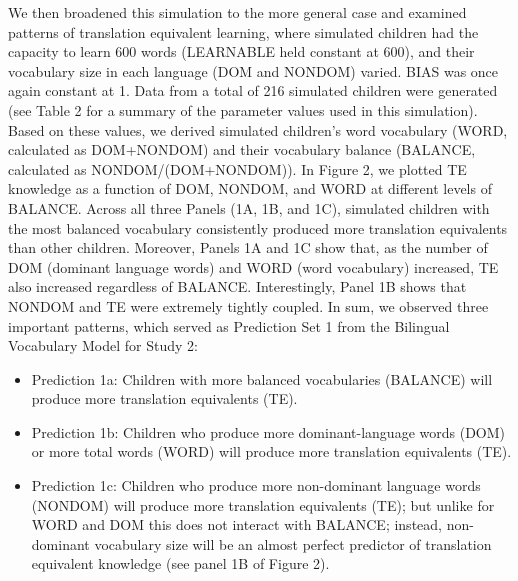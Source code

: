 \documentclass[
  english,
  ,man,floatsintext]{apa6}
\providecommand{\tightlist}{%
  \setlength{\itemsep}{0pt}\setlength{\parskip}{0pt}}
\begin{document}
We then broadened this simulation to the more general case and examined patterns of translation equivalent learning, where simulated children had the capacity to learn 600 words (LEARNABLE held constant at 600), and their vocabulary size in each language (DOM and NONDOM) varied. BIAS was once again constant at 1. Data from a total of 216 simulated children were generated (see Table 2 for a summary of the parameter values used in this simulation). Based on these values, we derived simulated children's word vocabulary (WORD, calculated as DOM+NONDOM) and their vocabulary balance (BALANCE, calculated as NONDOM/(DOM+NONDOM)). In Figure 2, we plotted TE knowledge as a function of DOM, NONDOM, and WORD at different levels of BALANCE. Across all three Panels (1A, 1B, and 1C), simulated children with the most balanced vocabulary consistently produced more translation equivalents than other children. Moreover, Panels 1A and 1C show that, as the number of DOM (dominant language words) and WORD (word vocabulary) increased, TE also increased regardless of BALANCE. Interestingly, Panel 1B shows that NONDOM and TE were extremely tightly coupled. In sum, we observed three important patterns, which served as Prediction Set 1 from the Bilingual Vocabulary Model for Study 2:

\begin{itemize}
\tightlist
\item
  Prediction 1a: Children with more balanced vocabularies (BALANCE) will produce more translation equivalents (TE).
\item
  Prediction 1b: Children who produce more dominant-language words (DOM) or more total words (WORD) will produce more translation equivalents (TE).
\item
  Prediction 1c: Children who produce more non-dominant language words (NONDOM) will produce more translation equivalents (TE); but unlike for WORD and DOM this does not interact with BALANCE; instead, non-dominant vocabulary size will be an almost perfect predictor of translation equivalent knowledge (see panel 1B of Figure 2).
\end{itemize}
\end{document}
